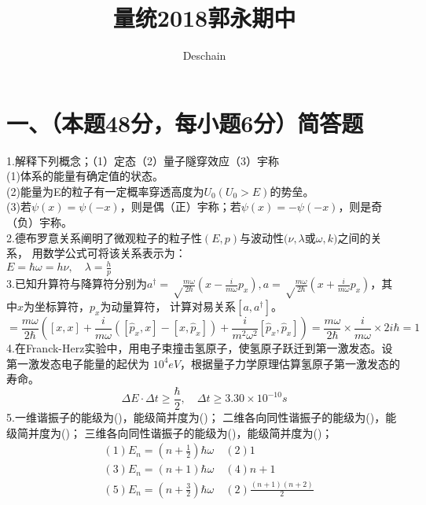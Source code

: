 \documentclass[UTF8]{ctexart}
\title{量统2018郭永期中}
\author{Deschain}
\begin{document}
\maketitle

\section*{一、（本题48分，每小题6分）简答题}
1.解释下列概念；（1）定态（2）量子隧穿效应（3）宇称\\
(1)体系的能量有确定值的状态。\\
(2)能量为E的粒子有一定概率穿透高度为$U_0(U_0>E)$的势垒。\\
(3)若$\psi(x)=\psi(-x)$，则是偶（正）宇称；若$\psi(x)=-\psi(-x)$，则是奇（负）宇称。\\
2.德布罗意关系阐明了微观粒子的粒子性$(E,p)$与波动性$(\nu,\lambda$或$\omega,k)$之间的关系，
用数学公式可将该关系表示为：\\
$E=\hbar\omega=h\nu,\quad\lambda=\frac{h}{p}$\\
3.已知升算符与降算符分别为$a^\dagger=\sqrt\frac{m\omega}{2\hbar}(x-\frac{i}{m\omega}p_x),
  a=\sqrt\frac{m\omega}{2\hbar}(x+\frac{i}{m\omega}p_x)$，其中$x$为坐标算符，$p_x$为动量算符，
计算对易关系$[a,a^\dagger]$。\\
\begin{equation*}
  [a,a^\dagger]=\frac{m\omega}{2\hbar}([x,x]+\frac{i}{m\omega}([\hat p_x,x]-[x,\hat p_x])
  +\frac{i}{m^2\omega^2}[\hat p_x,\hat p_x])
  =\frac{m\omega}{2\hbar}\times\frac{i}{m\omega}\times2i\hbar=1
\end{equation*}
4.在Franck-Herz实验中，用电子束撞击氢原子，使氢原子跃迁到第一激发态。设第一激发态电子能量的起伏为
$10^4eV$，根据量子力学原理估算氢原子第一激发态的寿命。\\
\begin{equation*}
  \Delta E\cdot\Delta t\geq\frac{\hbar}{2},\quad\Delta t\geq3.30\times10^{-10}s
\end{equation*}
5.一维谐振子的能级为(\quad\quad\quad\quad\quad)，能级简并度为(\quad\quad\quad\quad\quad)；
二维各向同性谐振子的能级为(\quad\quad\quad\quad\quad)，能级简并度为(\quad\quad\quad\quad\quad)；
三维各向同性谐振子的能级为(\quad\quad\quad\quad\quad)，能级简并度为(\quad\quad\quad\quad\quad)；\\
\begin{equation*}
  \begin{aligned}
     & (1)E_n=(n+\frac{1}{2})\hbar\omega\quad(2)1                    \\
     & (3)E_n=(n+1)\hbar\omega\quad(4)n+1                            \\
     & (5)E_n=(n+\frac{3}{2})\hbar\omega\quad(2)\frac{(n+1)(n+2)}{2}
  \end{aligned}
\end{equation*}
\end{document}
